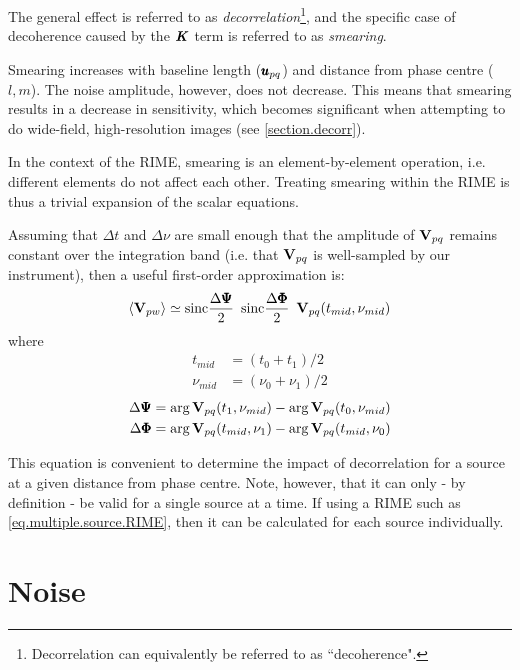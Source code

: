 \pg
The general effect is referred to as \emph{decorrelation}\footnote{Decorrelation can equivalently be referred to as ``decoherence".}, and the specific case of decoherence caused by the $\textbf{\emph{K}}$ term is referred to as \emph{smearing}.

\pg Smearing increases with baseline length ($\pmb{u}_{pq}$) and distance from phase centre ($l,m$). The noise amplitude, however, does not decrease. This means that smearing results in a decrease in sensitivity, which becomes significant when attempting to do wide-field, high-resolution images (see \cref{section.decorr}).

\pg 
In the context of the RIME, smearing is an element-by-element operation, i.e. different elements do not affect each other. Treating smearing within the RIME is thus a trivial expansion of the scalar equations.

\pg
Assuming that $\Delta t$ and $\Delta \nu$ are small enough that the amplitude of $\textbf{V}_{pq}$ remains constant over the integration band (i.e. that $\textbf{V}_{pq}$ is well-sampled by our instrument), then a useful first-order approximation is:
\begin{equation}
\langle \textbf{V}_{pw} \rangle \simeq \text{sinc}\frac{\Delta \pmb{\Psi}}{2} \enskip \text{sinc}\frac{\Delta \pmb{\Phi}}{2} \enskip \textbf{V}_{pq}(t_{mid},\nu_{mid})
\end{equation}
where
\begin{align}
t_{mid}           &= (t_0 + t_1)/2\\
\nu_{mid}         &= (\nu_0 + \nu_1)/2
\end{align}
\begin{align}
\Delta \pmb{\Psi} &= \arg \textbf{V}_{pq}(t_1,\nu_{mid}) - \arg \textbf{V}_{pq}(t_0, \nu_{mid})\\
\Delta \pmb{\Phi} &= \arg \textbf{V}_{pq}(t_{mid},\nu_1) - \arg \textbf{V}_{pq}(t_{mid}, \nu_0)
\end{align}

\pg
This equation is convenient to determine the impact of decorrelation for a source at a given distance from phase centre. Note, however, that it can only - by definition - be valid for a single source at a time. If using a RIME such as \cref{eq.multiple.source.RIME}, then it can be calculated for each source individually.

\section{Noise}
\label{section.RIME.noise}

